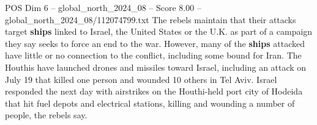 \begin{textsample}{POS Dim 6 – global\_north\_2024\_08 – Score 8.00 – global\_north\_2024\_08/112074799.txt}
The rebels maintain that their attacks target \textbf{ships} linked to Israel, the United States or the U.K. as part of a campaign they say seeks to force an end to the war.
However, many of the \textbf{ships} attacked have little or no connection to the conflict, including some bound for Iran.
The Houthis have launched drones and missiles toward Israel, including an attack on July 19 that killed one person and wounded 10 others in Tel Aviv.
Israel responded the next day with airstrikes on the Houthi-held port city of Hodeida that hit fuel depots and electrical stations, killing and wounding a number of people, the rebels say.

\end{textsample}

